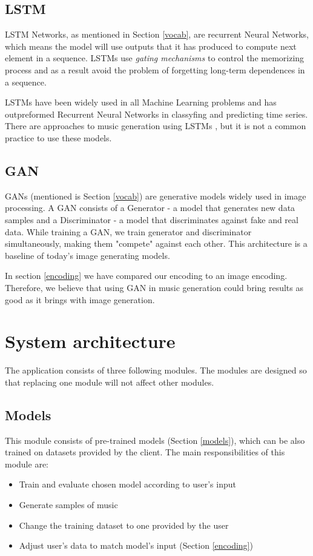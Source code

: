 \documentclass{article}
\begin{document}
\subsection{LSTM}

LSTM Networks, as mentioned in Section \ref{vocab}, are recurrent Neural Networks, which means the model will use outputs that it has produced to compute next element in a sequence. LSTMs use \textit{gating mechanisms} to control the memorizing process and as a result avoid the problem of forgetting long-term dependences in a sequence.

LSTMs have been widely used in all Machine Learning problems and has outpreformed Recurrent Neural Networks in classyfing and predicting time series. There are approaches to music generation using LSTMs \cite{lstm_arxiv}, but it is not a common practice to use these models.

\subsection{GAN}

GANs (mentioned is Section \ref{vocab}) are generative models widely used in image processing. A GAN consists of a Generator - a model that generates new data samples and a Discriminator - a model that discriminates against fake and real data. While training a GAN, we train generator and discriminator simultaneously, making them "compete" against each other. This architecture is a baseline of today's image generating models.

In section \ref{encoding} we have compared our encoding to an image encoding. Therefore, we believe that using GAN in music generation could bring results as good as it brings with image generation.

\section{System architecture}
The application consists of three following modules. The modules are designed so that replacing one module will not affect other modules.

\subsection{Models}
This module consists of pre-trained models (Section \ref{models}), which can be also trained on datasets provided by the client. The main responsibilities of this module are:
\begin{itemize}
    \item Train and evaluate chosen model according to user's input
    \item Generate samples of music
    \item Change the training dataset to one provided by the user
    \item Adjust user's data to match model's input (Section \ref{encoding})
\end{itemize}
\end{document}
